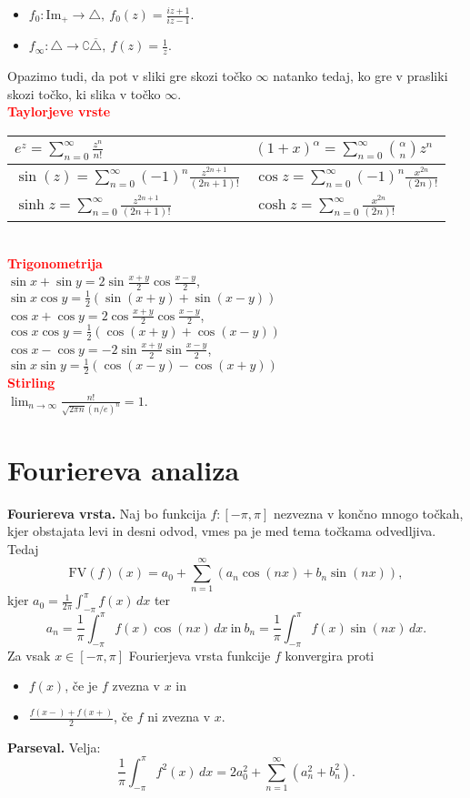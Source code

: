 \documentclass[a4paper,oneside,8pt,landscape]{extarticle}
\begin{document}
\begin{multicols*}{3}
\begin{itemize}
    \item \(f_0: \text{Im}_+ \to \triangle,\ f_0(z) = \frac{iz+1}{iz-1}\).
    \item \(f_\infty: \triangle \to \complement{\overline{\triangle}},\ f(z) = \frac{1}{z}\).
\end{itemize}
Opazimo tudi, da pot v sliki gre skozi točko \(\infty\) natanko tedaj, ko gre v prasliki skozi točko, ki slika v točko \(\infty\).\\
%
%
\textbf{\textcolor{red}{Taylorjeve vrste}}\\
\begin{tabular}{l|l}
\(e^z = \sum_{n=0}^{\infty} \frac{z^n}{n!}\) & \((1+x)^\alpha = \sum_{n=0}^{\infty} \binom{\alpha}{n}z^n\) \\
\hline
\(\sin(z) = \sum_{n=0}^{\infty}(-1)^n \frac{z^{2n+1}}{(2n+1)!}\)  & \(\cos z = \sum_{n=0}^{\infty} (-1)^n \frac{x^{2n}}{(2n)!}\) \\
\hline
\(\sinh z = \sum_{n=0}^{\infty} \frac{z^{2n+1}}{(2n+1)!}\) & \(\cosh z = \sum_{n=0}^{\infty} \frac{x^{2n}}{(2n)!}\)
\end{tabular}
\\
%
%
\textbf{\textcolor{red}{Trigonometrija}}\\
\(\sin x + \sin y = 2 \sin \frac{x+y}{2} \cos \frac{x-y}{2}\), \(\sin x \cos y = \frac{1}{2}(\sin(x+y) + \sin(x-y))\)\\
\(\cos x + \cos y = 2 \cos \frac{x+y}{2} \cos \frac{x-y}{2}\), \(\cos x \cos y = \frac{1}{2} (\cos (x+y) + \cos(x-y))\)\\
\(\cos x - \cos y = -2 \sin \frac{x+y}{2} \sin \frac{x-y}{2}\), \(\sin x \sin y = \frac{1}{2} (\cos (x - y) - \cos (x+y))\)\\
%
%
\textbf{\textcolor{red}{Stirling}}\\
\(\lim_{n \to \infty} \frac{n!}{\sqrt{2\pi n} (n/e)^n} = 1\).

\newpage
\section{Fouriereva analiza}
\textbf{Fouriereva vrsta.} Naj bo funkcija \(f: [-\pi, \pi]\) nezvezna v končno mnogo točkah, kjer obstajata levi in desni odvod, vmes pa je med tema točkama odvedljiva. Tedaj 
\[
    \text{FV}(f)(x) = a_0 + \sum_{n=1}^{\infty}(a_n \cos(nx) + b_n \sin(nx)),
\]
kjer \(a_0 = \frac{1}{2\pi} \int_{-\pi}^{\pi} f(x) \, dx\) ter 
\[a_n = \frac{1}{\pi} \int_{-\pi}^{\pi} f(x)  \cos(nx) \, dx\ \text{in}\ b_n = \frac{1}{\pi} \int_{-\pi}^{\pi} f(x)  \sin(nx) \, dx.\]
%
Za vsak \(x \in [-\pi, \pi]\) Fourierjeva vrsta funkcije \(f\) konvergira proti 
\begin{itemize}
    \item \(f(x)\), če je \(f\) zvezna v \(x\) in 
    \item \(\frac{f(x-) + f(x+)}{2}\), če \(f\) ni zvezna v \(x\).
\end{itemize}
%
\textbf{Parseval.} Velja:
\[
    \frac{1}{\pi} \int_{-\pi}^{\pi} f^2(x) \, dx = 2 a_0^2 + \sum_{n=1}^{\infty} (a_n^2 + b_n^2).
\]
%

\end{multicols*}
\end{document}
